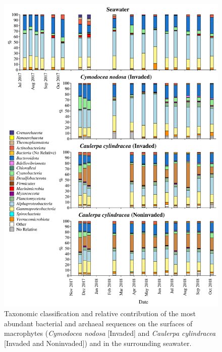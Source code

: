 \documentclass[12pt,]{article}
\begin{document}
\begin{figure}[H]

{\centering \includegraphics[width=0.85\linewidth]{../results/figures/community_bar_plot} 

}

\caption{Taxonomic classification and relative contribution of the most abundant bacterial and archaeal sequences on the surfaces of macrophytes (\textit{Cymodocea nodosa} [Invaded] and \textit{Caulerpa cylindracea} [Invaded and Noninvaded]) and in the surrounding seawater.\label{community}}\label{fig:unnamed-chunk-4}
\end{figure}
\end{document}
